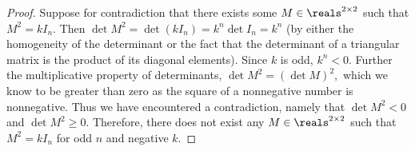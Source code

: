\begin{proof}
    Suppose for contradiction that there exists some $M\in\reals^{2\times 2}$ such that $M^2=kI_n.$
    Then $\det M^2=\det(kI_n)=k^n\det I_n=k^n$ (by either the homogeneity of the determinant or the fact that the determinant of a triangular matrix is the product of its diagonal elements).
    Since $k$ is odd, $k^n<0.$
    Further the multiplicative property of determinants, $\det M^2 = (\det M)^2,$ which we know to be greater than zero as the square of a nonnegative number is nonnegative.
    Thus we have encountered a contradiction, namely that $\det M^2 < 0$ and $\det M^2 \geq 0.$
    Therefore, there does not exist any $M\in\reals^{2\times 2}$ such that $M^2=kI_n$ for odd $n$ and negative $k.$
\end{proof}